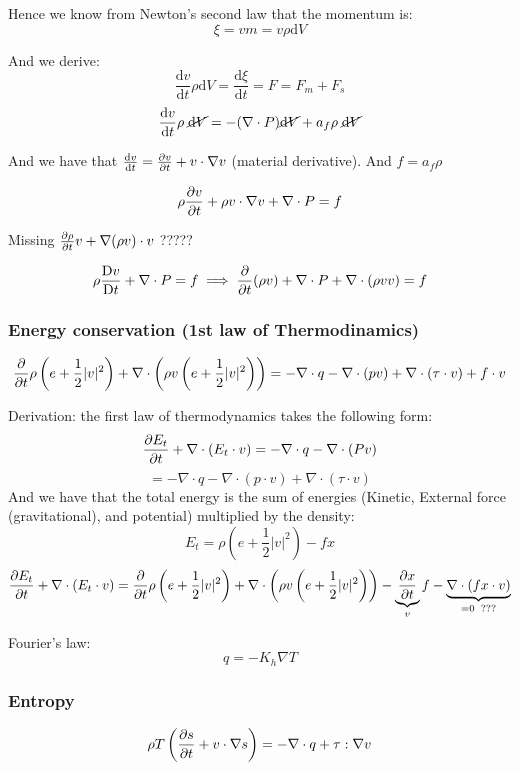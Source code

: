 \documentclass[main.tex]{subfiles}
\begin{document}
Hence we know from Newton's second law that the momentum is: 
$$\xi = v m = v \rho \text{d} V$$

And we derive:
$$\frac{\text{d} v}{\text{d} t}\rho \text{d}V = \frac{\text{d} \xi}{\text{d} t} = F = F_m + F_s$$
$$\frac{\text{d} v}{\text{d} t}\rho \; \cancel{\text{d}V} = -(\nabla\cdot P) \cancel{\text{d} V} + a_f\rho\; \cancel{\text{d}V}$$

And we have that $\frac{\text{d} v}{\text{d} t} = \frac{\partial v}{\partial t} + v \cdot\nabla v$ (material derivative). And $f = a_f\rho$

$$\rho \frac{\partial v}{\partial t} + \rho v\cdot \nabla v + \nabla \cdot P = f$$

Missing $\frac{\partial \rho}{\partial t} v + \nabla(\rho v)\cdot v$ ????? 

$$\rho\frac{\text{D} v}{\text{D} t} + \nabla\cdot P = f \implies \frac{\partial }{\partial t}(\rho v) + \nabla \cdot P + \nabla\cdot(\rho vv) = f$$

\subsubsection{Energy conservation (1st law of Thermodinamics)}
$$\frac{\partial }{\partial t}\rho\left(e + \frac{1}{2}|v|^2\right) + \nabla\cdot \left(\rho v\left(e + \frac{1}{2}|v|^2\right)\right) = -\nabla\cdot q -\nabla\cdot (p v) + \nabla \cdot (\tau \cdot v) + f \cdot v$$

Derivation:
the first law of thermodynamics takes the following form:
$$
\frac{\partial E_t}{\partial t} + \nabla\cdot(E_t\cdot v) = -\nabla\cdot q - \nabla\cdot(P v)$$
$$= -\nabla\cdot q -\nabla\cdot (p\cdot v) + \nabla \cdot (\tau \cdot v)$$
And we have that the total energy is the sum of energies (Kinetic, External force (gravitational), and potential) multiplied by the density:
$$E_t = \rho(e + \frac{1}{2}|v|^2) - f x$$
$$\frac{\partial E_t}{\partial t} + \nabla\cdot(E_t\cdot v) =\frac{\partial }{\partial t}\rho\left(e + \frac{1}{2}|v|^2\right) + \nabla\cdot\left(\rho v\left( e + \frac{1}{2}|v|^2\right)\right) - \underbrace{\frac{\partial x}{\partial t}}_{v} f - \underbrace{\nabla\cdot(fx\cdot v)}_{=0\;\; ???}$$


Fourier's law:
$$q = -K_h\nabla T$$

\subsubsection{Entropy}
$$\rho T \left(\frac{\partial s}{\partial t} + v\cdot \nabla s\right) = - \nabla\cdot q + \tau : \nabla v$$
\end{document}

